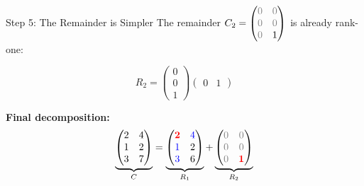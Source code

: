 \documentclass[10pt]{beamer}
\theoremstyle{definition}
\newcommand{\pvt}[1]{{\color{red}\mathbf{#1}}}       %
\newcommand{\crs}[1]{{\color{blue}#1}}                %
\newcommand{\rem}[1]{{\color{gray}#1}}                %
\begin{document}
\begin{frame}{Step 5: The Remainder is Simpler}
The remainder $C_2 = \begin{pmatrix}
\rem{0} & \rem{0} \\
\rem{0} & \rem{0} \\
\rem{0} & 1
\end{pmatrix}$ is already rank-one:

$$R_2 = \begin{pmatrix} 0 \\ 0 \\ 1 \end{pmatrix}\begin{pmatrix} 0 & 1 \end{pmatrix}$$

\vfill
\textbf{Final decomposition:}
$$\underbrace{\begin{pmatrix}
2 & 4 \\
1 & 2 \\
3 & 7
\end{pmatrix}}_{C}
= \underbrace{\begin{pmatrix}
\pvt{2} & \crs{4} \\
\crs{1} & 2 \\
\crs{3} & 6
\end{pmatrix}}_{R_1}
+ \underbrace{\begin{pmatrix}
\rem{0} & \rem{0} \\
\rem{0} & \rem{0} \\
\rem{0} & \pvt{1}
\end{pmatrix}}_{R_2}$$
\end{frame}
\end{document}
